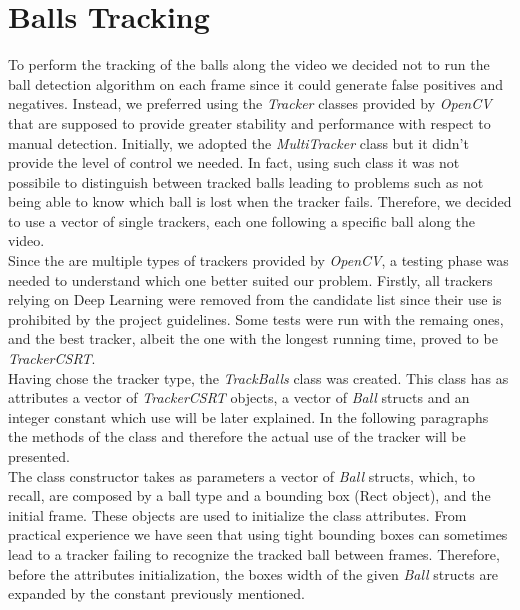 \section{Balls Tracking}

To perform the tracking of the balls along the video we decided not to run the ball detection algorithm on each frame since it could generate false positives and negatives.
Instead, we preferred using the \textit{Tracker} classes provided by \textit{OpenCV} that are supposed to provide greater stability and performance with respect to manual detection.
Initially, we adopted the \textit{MultiTracker} class but it didn't provide the level of control we needed. In fact, using such class it was not possibile to distinguish
between tracked balls leading to problems such as not being able to know which ball is lost when the tracker fails. Therefore, we decided to use a vector of single trackers,
each one following a specific ball along the video.
\newline \\
Since the are multiple types of trackers provided by \textit{OpenCV}, a testing phase was needed to understand which one better suited our problem. Firstly, all trackers
relying on Deep Learning were removed from the candidate list since their use is prohibited by the project guidelines. Some tests were run with the remaing ones, and the best tracker,
albeit the one with the longest running time, proved to be \textit{TrackerCSRT}.
\newline \\
Having chose the tracker type, the \textit{TrackBalls} class was created. This class has as attributes a vector of \textit{TrackerCSRT} objects, a vector of \textit{Ball} structs
and an integer constant which use will be later explained. In the following paragraphs the methods of the class and therefore the actual use of the tracker will be presented.
\newline \\
The class constructor takes as parameters a vector of \textit{Ball} structs, which, to recall, are composed by a ball type and a bounding box (Rect object), and the initial frame.
These objects are used to initialize the class attributes. From practical experience we have seen that using tight bounding boxes can sometimes lead to a tracker failing
to recognize the tracked ball between frames. Therefore, before the attributes initialization, the boxes width of the given \textit{Ball} structs are expanded by the constant
previously mentioned. 
\newline \\
